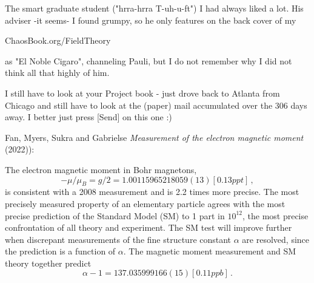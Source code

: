 \begin{description}
The smart graduate student ("hrra-hrra T-uh-u-ft") I had always liked a lot. His adviser -it seems- I found grumpy, so he only features on the back cover of my

{ChaosBook.org/FieldTheory}

as "El Noble Cigaro", channeling Pauli, but I do not remember why I did not think all that highly of him.

I still have to look at your Project book - just drove back to Atlanta from Chicago and still have to look at the (paper) mail accumulated over the 306 days away. I better just press [Send] on this one :)



\item[2022-09-27 Gabrielse]
Fan, Myers, Sukra and Gabrielse
{\em Measurement of the electron magnetic moment} (2022)):

The electron magnetic moment in Bohr magnetons,
\[
-\mu/\mu_B=g/2=
1.00115965218059(13)[0.13ppt]
\,,
\]
is consistent with a 2008 measurement and is 2.2 times more
precise. The most precisely measured property of an elementary particle
agrees with the most precise prediction of the Standard Model (SM) to 1 part
in $10^12$, the most precise confrontation of all theory and experiment. The
SM test will improve further when discrepant measurements of the fine
structure constant $\alpha$ are resolved, since the prediction is a function
of $\alpha$. The magnetic moment measurement and SM theory together predict
\[
\alpha-1=137.035999166(15)[0.11ppb]
\,.
\]





\end{description}
